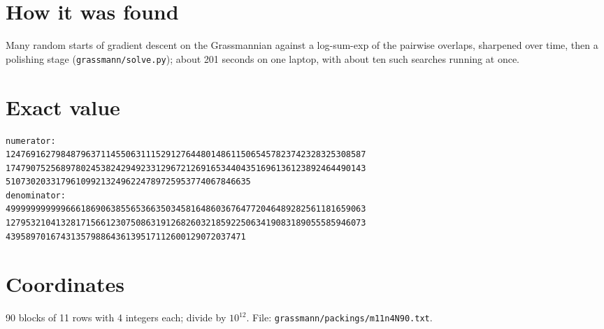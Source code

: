 \documentclass[11pt,a4paper]{article}
\begin{document}
\section{How it was found}
Many random starts of gradient descent on the Grassmannian against a log-sum-exp of the pairwise overlaps, sharpened over time, then a polishing stage (\texttt{grassmann/solve.py}); about 201 seconds on one laptop, with about ten such searches running at once.


\appendix
\section{Exact value}
{\small
\begin{verbatim}
numerator:
124769162798487963711455063111529127644801486115065457823742328325308587
174790752568978024538242949233129672126916534404351696136123892464490143
5107302033179610992132496224789725953774067846635
denominator:
499999999999666186906385565366350345816486036764772046489282561181659063
127953210413281715661230750863191268260321859225063419083189055585946073
439589701674313579886436139517112600129072037471
\end{verbatim}}

\section{Coordinates}
90 blocks of 11 rows with 4 integers each; divide by $10^{12}$. File: \texttt{grassmann/packings/m11n4N90.txt}.
{\tiny
\begin{multicols}{3}
\end{multicols}}
\end{document}
